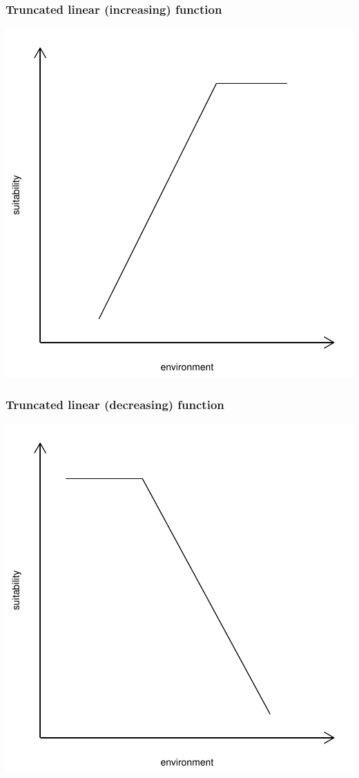 \documentclass{report}
\begin{document}
\subsubsection*{Truncated linear (increasing) function}
\includegraphics{sdmvspecies-truncated_linear_increasing_function}
\subsubsection*{Truncated linear (decreasing) function}
\includegraphics{sdmvspecies-truncated_linear_decrease_function}
\end{document}
